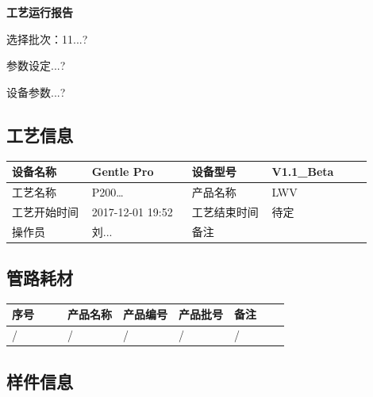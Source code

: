 \documentclass[UTF8,10pt,a4paper,fontset=fandol]{ctexart}
\newcommand{\fieldvalue}[1]{#1}
\newcommand{\handwritten}[1]{#1}
\begin{document}
\begin{center}
\begin{minipage}[t]{0.47\linewidth}
\centering
\textbf{工艺运行报告}

\handwritten{选择批次：11...?}

\handwritten{参数设定...?}

\handwritten{设备参数...?}

\subsection*{工艺信息}

\begin{tabular}{|p{0.20\linewidth}|p{0.25\linewidth}|p{0.20\linewidth}|p{0.25\linewidth}|}
\hline
设备名称 &
\fieldvalue{Gentle Pro} &
设备型号 &
\fieldvalue{V1.1\_Beta}
\\ \hline
工艺名称 &
\fieldvalue{P200\ldots} &
产品名称 &
\fieldvalue{LWV}
\\ \hline
工艺开始时间 &
\fieldvalue{2017-12-01 19:52} &
工艺结束时间 &
\fieldvalue{待定}
\\ \hline
操作员 &
\fieldvalue{\handwritten{刘...}} &
备注 & \\
\hline
\end{tabular}

\subsection*{管路耗材}

\begin{tabular}{|p{0.20\linewidth}|p{0.20\linewidth}|p{0.20\linewidth}|p{0.20\linewidth}|p{0.20\linewidth}|}
\hline
序号 & 产品名称 & 产品编号 & 产品批号 & 备注 \\ \hline
/ & / & / & / & / \\ \hline
\end{tabular}

\subsection*{样件信息}


\end{minipage}
\end{center}
\end{document}

